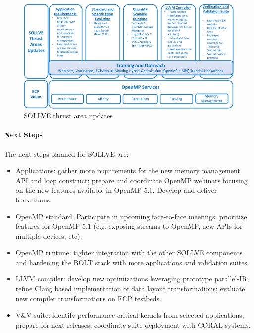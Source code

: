 \begin{figure}[t]
\centering
\includegraphics[width=0.9\linewidth]{projects/2.3.1-PMR/2.3.1.13-SOLLVE/SOLLVE-progress}
\caption{\label{fig:sollve-update}SOLLVE thrust area updates}
\end{figure}

\paragraph*{Next Steps}
 The next steps planned for SOLLVE are:
\begin{itemize}
\item Applications: gather more requirements for  the new memory management API and loop construct; prepare and coordinate OpenMP webinars focusing on 
the new features available in OpenMP 5.0.
Develop and deliver hackathons. 
\item OpenMP standard: Participate in upcoming face-to-face meetings; %
 prioritize features for OpenMP 5.1 (e.g. exposing streams to OpenMP, new APIs for multiple devices, etc).
\item OpenMP runtime: tighter integration with the other SOLLVE components and hardening the BOLT stack with more applications and validation suites.
\item LLVM compiler: develop new optimizations leveraging prototype parallel-IR; refine Clang based implementation of data layout transformations; evaluate new compiler transformations on ECP testbeds.
\item V\&V suite: identify performance critical kernels from selected applications; prepare for next releases;  %
 coordinate suite deployment with CORAL systems.
\end{itemize}

